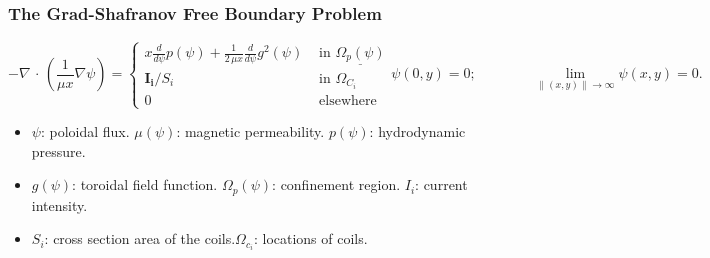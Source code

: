\documentclass{beamer}
\begin{document}
\begin{frame}[t]
\frametitle{The Grad-Shafranov Free Boundary Problem}
\vspace{-4mm}
\begin{minipage}[t]{\linewidth}
    {\footnotesize
        \begin{subequations}
            \begin{equation*}
            -\nabla\,\cdot\,\left(\frac{1}{\mu x}\nabla\psi\right) = \left\{ \begin{array}{ll}
            x\frac{d}{d\psi} p(\psi) + \frac{1}{2\, \mu x} \frac{d}{d\psi}  g^2(\psi) & \text{ in } \underline{\Omega_p(\psi)} \\
            \boldsymbol{I_i}/S_i & \text{ in } \Omega_{C_i} \\
            0 & \text{ elsewhere } 
            \end{array}\right.
            \end{equation*}
            \begin{equation*}
            \psi(0,y) = 0 ; \qquad \qquad  \lim_{\|(x,y)\|\to\infty}\psi(x,y) = 0. 
            \end{equation*}
        \end{subequations}}

{\footnotesize
              \begin{itemize}[leftmargin=0pt] 
                    \item[]	\textcolor{myblue3}{$\psi$:} \textcolor{mybrown1}{poloidal flux.}
                    \; \textcolor{myblue3}{$\mu(\psi)$:} \textcolor{mybrown1}{magnetic permeability.} 
                    \; \textcolor{myblue3}{$p(\psi)$:} \textcolor{mybrown1}{hydrodynamic pressure}.
                    
                    \vspace{-1.5mm}
                    \item[]	\textcolor{myblue3}{$g(\psi)$:}  \textcolor{mybrown1}{toroidal field function.}
                    \;\textcolor{myblue3}{$\Omega_p(\psi)$:} \textcolor{mybrown1}{confinement region.}
                    \;\textcolor{myblue3}{$I_i$:} \textcolor{mybrown1}{current intensity.}

                    \vspace{-1.5mm}
                    \item[]	\textcolor{myblue3}{$S_i$:} \textcolor{mybrown1}{cross section area of the coils.}\quad \textcolor{myblue3}{$\Omega_{c_i}$:} \textcolor{mybrown1}{locations of coils.}
                \end{itemize}
    }
    

\end{minipage}
\end{frame}
\end{document}
